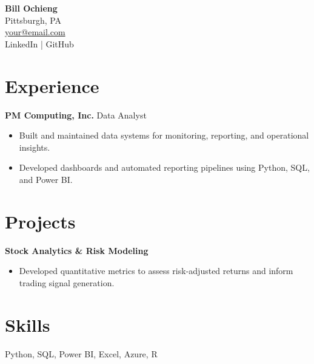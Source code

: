 \documentclass[11pt]{article}
\begin{document}
\begin{center}
    {\LARGE \textbf{Bill Ochieng}} \\
    Pittsburgh, PA \\
    \href{mailto:your@email.com}{your@email.com} \\
    LinkedIn | GitHub
\end{center}

\section*{Experience}
\textbf{PM Computing, Inc.} \hfill Data Analyst \\
\begin{itemize}[leftmargin=*]
    \item Built and maintained data systems for monitoring, reporting, and operational insights.
    \item Developed dashboards and automated reporting pipelines using Python, SQL, and Power BI.
\end{itemize}

\section*{Projects}
\textbf{Stock Analytics \& Risk Modeling} \\
\begin{itemize}[leftmargin=*]
    \item Developed quantitative metrics to assess risk-adjusted returns and inform trading signal generation.
\end{itemize}

\section*{Skills}
Python, SQL, Power BI, Excel, Azure, R
\end{document}
